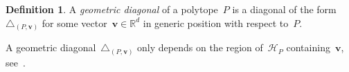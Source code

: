 \documentclass{amsart}
\newcommand{\darkblue}{\color{darkblue}} %
\theoremstyle{definition}
\newtheorem{definition}[theorem]{Definition}
\newcommand{\R}{\mathbb{R}} %
\renewcommand{\b}[1]{{\boldsymbol{#1}}} %
\newcommand{\defn}[1]{\textsl{\darkblue #1}} %
\renewcommand{\b}[1]{\boldsymbol{#1}} %
\begin{document}
\begin{definition}
\label{def:geometricDiagonal}
A \defn{geometric diagonal} of a polytope~$P$ is a diagonal of the form~$\triangle_{(P,\b{v})}$ for some vector~$\b{v} \in \R^d$ in generic position with respect to~$P$.
\end{definition}

A geometric diagonal~$\triangle_{(P,\b{v})}$ only depends on the region of~$\mathcal{H}_P$ containing~$\b{v}$, see~\cite[Prop.~1.23]{LaplanteAnfossi}.

\begin{figure}[p]
	\centerline{}
\end{figure}
\end{document}
